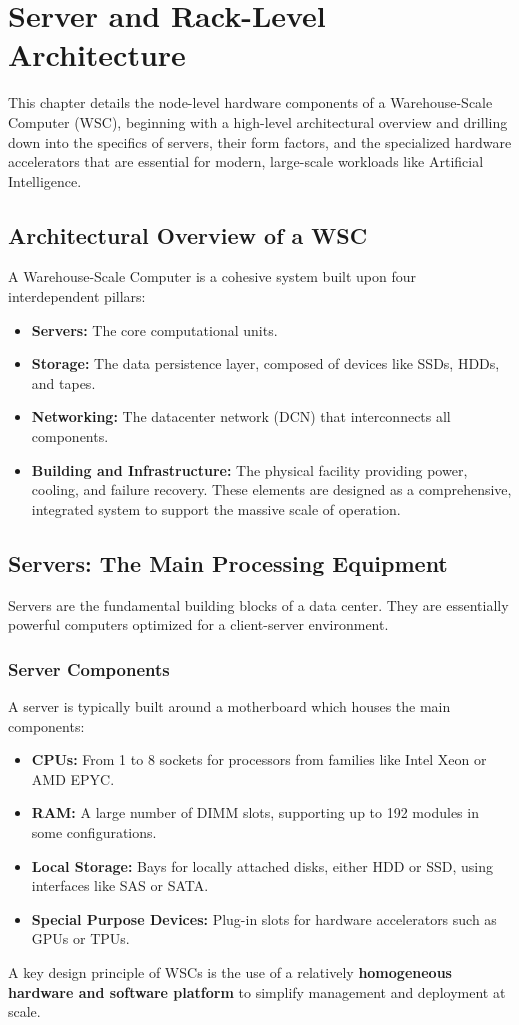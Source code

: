 \chapter{Server and Rack-Level Architecture}

This chapter details the node-level hardware components of a Warehouse-Scale Computer (WSC), beginning with a high-level architectural overview and drilling down into the specifics of servers, their form factors, and the specialized hardware accelerators that are essential for modern, large-scale workloads like Artificial Intelligence.

\section{Architectural Overview of a WSC}
A Warehouse-Scale Computer is a cohesive system built upon four interdependent pillars:
\begin{itemize}
    \item \textbf{Servers:} The core computational units.
    \item \textbf{Storage:} The data persistence layer, composed of devices like SSDs, HDDs, and tapes.
    \item \textbf{Networking:} The datacenter network (DCN) that interconnects all components.
    \item \textbf{Building and Infrastructure:} The physical facility providing power, cooling, and failure recovery. These elements are designed as a comprehensive, integrated system to support the massive scale of operation.
\end{itemize}

\section{Servers: The Main Processing Equipment}
Servers are the fundamental building blocks of a data center. They are essentially powerful computers optimized for a client-server environment.

\subsection{Server Components}
A server is typically built around a motherboard which houses the main components:
\begin{itemize}
    \item \textbf{CPUs:} From 1 to 8 sockets for processors from families like Intel Xeon or AMD EPYC.
    \item \textbf{RAM:} A large number of DIMM slots, supporting up to 192 modules in some configurations.
    \item \textbf{Local Storage:} Bays for locally attached disks, either HDD or SSD, using interfaces like SAS or SATA.
    \item \textbf{Special Purpose Devices:} Plug-in slots for hardware accelerators such as GPUs or TPUs.
\end{itemize}
A key design principle of WSCs is the use of a relatively \textbf{homogeneous hardware and software platform} to simplify management and deployment at scale.

